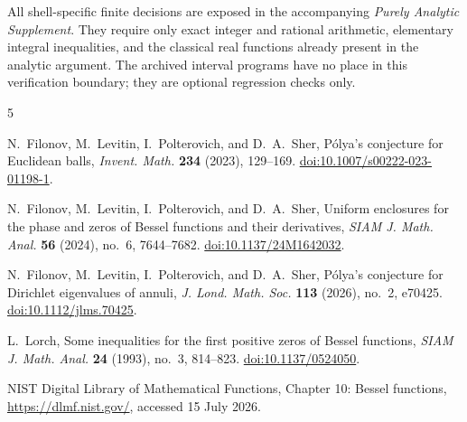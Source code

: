 \documentclass[11pt]{article}
\numberwithin{equation}{section}
\theoremstyle{definition}
\theoremstyle{remark}
\begin{document}
All shell-specific finite decisions are exposed in the accompanying
\emph{Purely Analytic Supplement}.  They require only exact integer and
rational arithmetic, elementary integral inequalities, and the classical
real functions already present in the analytic argument.  The archived
interval programs have no place in this verification boundary; they are
optional regression checks only.

\begin{thebibliography}{5}

N.~Filonov, M.~Levitin, I.~Polterovich, and D.~A.~Sher,
\newblock P\'olya's conjecture for Euclidean balls,
\newblock \emph{Invent. Math.} \textbf{234} (2023), 129--169.
\newblock \href{https://doi.org/10.1007/s00222-023-01198-1}{doi:10.1007/s00222-023-01198-1}.

N.~Filonov, M.~Levitin, I.~Polterovich, and D.~A.~Sher,
\newblock Uniform enclosures for the phase and zeros of Bessel functions and
their derivatives,
\newblock \emph{SIAM J. Math. Anal.} \textbf{56} (2024), no.~6, 7644--7682.
\newblock \href{https://doi.org/10.1137/24M1642032}{doi:10.1137/24M1642032}.

N.~Filonov, M.~Levitin, I.~Polterovich, and D.~A.~Sher,
\newblock P\'olya's conjecture for Dirichlet eigenvalues of annuli,
\newblock \emph{J. Lond. Math. Soc.} \textbf{113} (2026), no.~2, e70425.
\newblock \href{https://doi.org/10.1112/jlms.70425}{doi:10.1112/jlms.70425}.

L.~Lorch,
\newblock Some inequalities for the first positive zeros of Bessel
functions,
\newblock \emph{SIAM J. Math. Anal.} \textbf{24} (1993), no.~3, 814--823.
\newblock \href{https://doi.org/10.1137/0524050}{doi:10.1137/0524050}.

NIST Digital Library of Mathematical Functions,
\newblock Chapter 10: Bessel functions,
\newblock \url{https://dlmf.nist.gov/}, accessed 15 July 2026.

\end{thebibliography}
\end{document}
